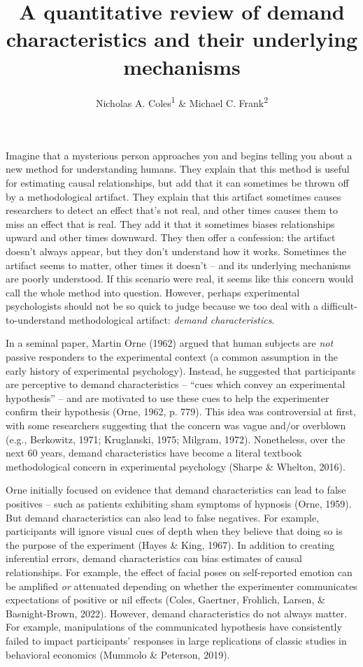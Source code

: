 \documentclass[
  man,floatsintext]{apa6}
\title{A quantitative review of demand characteristics and their underlying mechanisms}
\author{Nicholas A. Coles\textsuperscript{1} \& Michael C. Frank\textsuperscript{2}}
\date{}
\affiliation{\vspace{0.5cm}\textsuperscript{1} Center for the Study of Language and Information, Stanford University\\\textsuperscript{2} Department of Psychology, Stanford University}
\begin{document}
\maketitle

Imagine that a mysterious person approaches you and begins telling you about a new method for understanding humans. They explain that this method is useful for estimating causal relationships, but add that it can sometimes be thrown off by a methodological artifact. They explain that this artifact sometimes causes researchers to detect an effect that's not real, and other times causes them to miss an effect that is real. They add it that it sometimes biases relationships upward and other times downward. They then offer a confession: the artifact doesn't always appear, but they don't understand how it works. Sometimes the artifact seems to matter, other times it doesn't -- and its underlying mechanisms are poorly understood. If this scenario were real, it seems like this concern would call the whole method into question. However, perhaps experimental psychologists should not be so quick to judge because we too deal with a difficult-to-understand methodological artifact: \emph{demand characteristics}.

In a seminal paper, Martin Orne (1962) argued that human subjects are \emph{not} passive responders to the experimental context (a common assumption in the early history of experimental psychology). Instead, he suggested that participants are perceptive to demand characteristics -- ``cues which convey an experimental hypothesis'' -- and are motivated to use these cues to help the experimenter confirm their hypothesis (Orne, 1962, p. 779). This idea was controversial at first, with some researchers suggesting that the concern was vague and/or overblown (e.g., Berkowitz, 1971; Kruglanski, 1975; Milgram, 1972). Nonetheless, over the next 60 years, demand characteristics have become a literal textbook methodological concern in experimental psychology (Sharpe \& Whelton, 2016).

Orne initially focused on evidence that demand characteristics can lead to false positives -- such as patients exhibiting sham symptoms of hypnosis (Orne, 1959). But demand characteristics can also lead to false negatives. For example, participants will ignore visual cues of depth when they believe that doing so is the purpose of the experiment (Hayes \& King, 1967). In addition to creating inferential errors, demand characteristics can bias estimates of causal relationships. For example, the effect of facial poses on self-reported emotion can be amplified \emph{or} attenuated depending on whether the experimenter communicates expectations of positive or nil effects (Coles, Gaertner, Frohlich, Larsen, \& Basnight-Brown, 2022). However, demand characteristics do not always matter. For example, manipulations of the communicated hypothesis have consistently failed to impact participants' responses in large replications of classic studies in behavioral economics (Mummolo \& Peterson, 2019).
\end{document}
